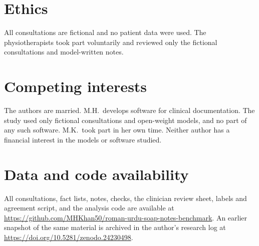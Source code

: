 \documentclass[11pt]{article}
\begin{document}
\section*{Ethics}
All consultations are fictional and no patient data were used. The physiotherapists took part voluntarily and reviewed only the fictional consultations and model-written notes.

\section*{Competing interests}
The authors are married. M.H.\ develops software for clinical documentation. The study used only fictional consultations and open-weight models, and no part of any such software. M.K.\ took part in her own time. Neither author has a financial interest in the models or software studied.

\section{Data and code availability}
All consultations, fact lists, notes, checks, the clinician review sheet, labels and agreement script, and the analysis code are available at \url{https://github.com/MHKhan50/roman-urdu-soap-notes-benchmark}. An earlier snapshot of the same material is archived in the author's research log at \url{https://doi.org/10.5281/zenodo.24230498}.



\end{document}
